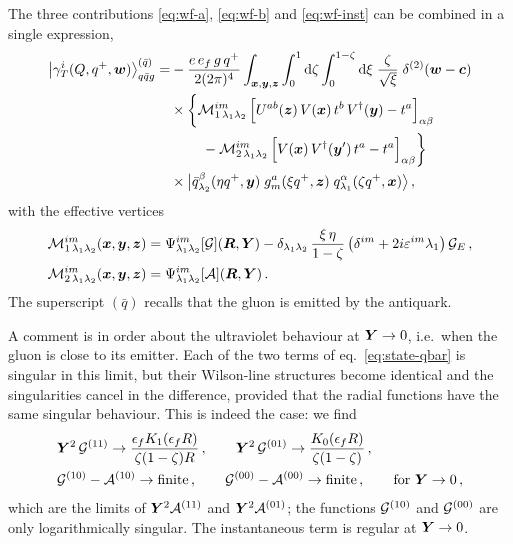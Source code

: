 The three contributions \eqref{eq:wf-a}, \eqref{eq:wf-b} and \eqref{eq:wf-inst} can be combined in a
single expression,
\begin{align}
\big|\gamma_T^i(Q,q^+,\bm{w})\big\rangle^{(\bar q)}_{q\bar q g}=&-\frac{e\,e_f\,g\,q^+}{2(2\pi)^4}\int_{\bm{x},\bm{y},\bm{z}}
\int_0^1{\rm d}\zeta\int_0^{1-\zeta}{\rm d}\xi\;\frac{\zeta}{\sqrt\xi}\;\delta^{(2)}(\bm{w}-\bm{c})
\nonumber\\
&\times\bigg\{\mathcal{M}^{im}_{1\,\lambda_1\lambda_2}\,\Big[U^{ab}(\bm{z})\,V(\bm{x})\,t^b\,V^\dagger(\bm{y})-t^a\Big]_{\alpha\beta}
\nonumber\\
&\qquad\;-\mathcal{M}^{im}_{2\,\lambda_1\lambda_2}\,\Big[V(\bm{x})\,V^\dagger(\bm{y}')\,t^a-t^a\Big]_{\alpha\beta}\bigg\}
\nonumber\\
&\times\big|\bar q^\beta_{\lambda_2}(\eta q^+,\bm{y})\;g^a_m(\xi q^+,\bm{z})\;q^\alpha_{\lambda_1}(\zeta q^+,\bm{x})\big\rangle\,,
\label{eq:state-qbar}
\end{align}
with the effective vertices
\begin{align}
\mathcal{M}^{im}_{1\,\lambda_1\lambda_2}(\bm{x},\bm{y},\bm{z})&=\Psi^{im}_{\lambda_1\lambda_2}[\mathcal{G}](\bm{R},\bm{Y})
-\delta_{\lambda_1\lambda_2}\,\frac{\xi\,\eta}{1-\zeta}\,\big(\delta^{im}+2i\varepsilon^{im}\lambda_1\big)\,\mathcal{G}_E\,,
\nonumber\\
\mathcal{M}^{im}_{2\,\lambda_1\lambda_2}(\bm{x},\bm{y},\bm{z})&=\Psi^{im}_{\lambda_1\lambda_2}[\mathcal{A}](\bm{R},\bm{Y})\,.
\label{eq:M}
\end{align}
The superscript $(\bar q)$ recalls that the gluon is emitted by the antiquark.

A comment is in order about the ultraviolet behaviour at $\bm{Y}\to0$, i.e.\ when the gluon is close to its
emitter. Each of the two terms of eq.~\eqref{eq:state-qbar} is singular in this limit, but their
Wilson-line structures become identical and the singularities cancel in the difference, provided that
the radial functions have the same singular behaviour. This is indeed the case: we find
\begin{align}
&\bm{Y}^2\,\mathcal{G}^{(11)}\to\frac{\epsilon_f K_1(\epsilon_f R)}{\zeta(1-\zeta)R}\,,\qquad
\bm{Y}^2\,\mathcal{G}^{(01)}\to\frac{K_0(\epsilon_f R)}{\zeta(1-\zeta)}\,,\qquad
\nonumber\\
&\mathcal{G}^{(10)}-\mathcal{A}^{(10)}\to{\rm finite}\,,\qquad\mathcal{G}^{(00)}-\mathcal{A}^{(00)}\to{\rm finite}\,,
\qquad\text{for }\bm{Y}\to0\,,
\label{eq:UV}
\end{align}
which are the limits of $\bm{Y}^2\mathcal{A}^{(11)}$ and $\bm{Y}^2\mathcal{A}^{(01)}$; the functions $\mathcal{G}^{(10)}$ and
$\mathcal{G}^{(00)}$ are only logarithmically singular. The instantaneous term is regular at $\bm{Y}\to0$.

